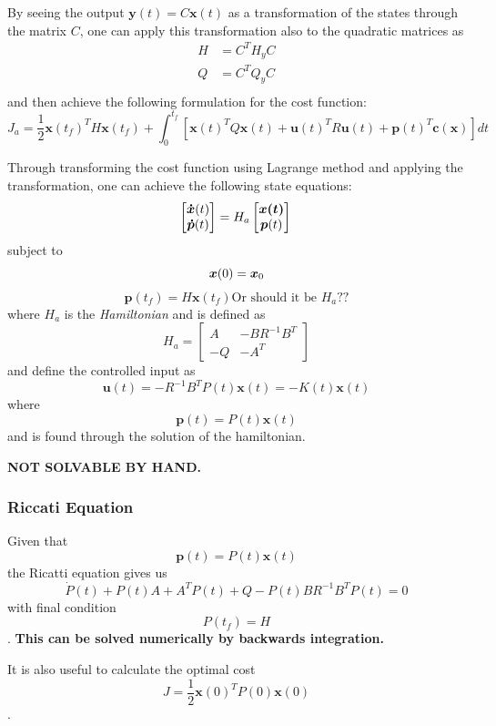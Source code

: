 \documentclass[a4paper]{report}
\begin{document}
By seeing the output $\bm{y}(t) = C\bm{x}(t)$ as a transformation of the states through the matrix $C$, one can apply this transformation also to the quadratic matrices as 
\begin{align*}
    H &= C^{T}H_yC \\
    Q &= C^{T}Q_yC \\
\end{align*}
and then achieve the following formulation for the cost function: \[
    J_a = \frac{1}{2}\bm{x}(t_f)^{T}H\bm{x}(t_f) + \int_0^{t_f}\left[ \bm{x}(t)^{T}Q\bm{x}(t) + \bm{u}(t)^{T}R\bm{u}(t) + \bm{p}(t)^{T}\bm{c}(\bm{x}) \right] dt
\]

Through transforming the cost function using Lagrange method and applying the transformation, one can achieve the following state equations: \[
    \begin{bmatrix} \bm{\dot{x}}(t) \\ \bm{\dot{p}}(t) \end{bmatrix} = H_a \begin{bmatrix} \bm{x(t)} \\ \bm{p}(t) \end{bmatrix} \\
\] subject to \[
    \bm{x}(0) = \bm{x}_0 \\
\] \[
    \bm{p}(t_f) = H\bm{x}(t_f) \text{Or should it be $H_a$??}
\] where $H_a$ is the \emph{Hamiltonian} and is defined as \[
H_a = \begin{bmatrix} A & -BR^{-1}B^{T} \\ -Q & -A^{T} \end{bmatrix}
\] and define the controlled input as \[
\bm{u}(t) = -R^{-1}B^{T}P(t)\bm{x}(t) = -K(t)\bm{x}(t)
\] where \[
\bm{p}(t) = P(t)\bm{x}(t)
\] and is found through the solution of the hamiltonian.

\textbf{NOT SOLVABLE BY HAND.}

\subsubsection*{Riccati Equation}

Given that \[
\bm{p}(t) = P(t)\bm{x}(t)
\] the Ricatti equation gives us \[
\dot{P}(t) + P(t)A + A^{T}P(t) + Q - P(t)BR^{-1}B^{T}P(t) = 0
\] with final condition \[
P(t_f) = H
\]. \textbf{This can be solved numerically by backwards integration.}

It is also useful to calculate the optimal cost \[
    J = \frac{1}{2}\bm{x}(0)^{T}P(0)\bm{x}(0)
\].
\end{document}
